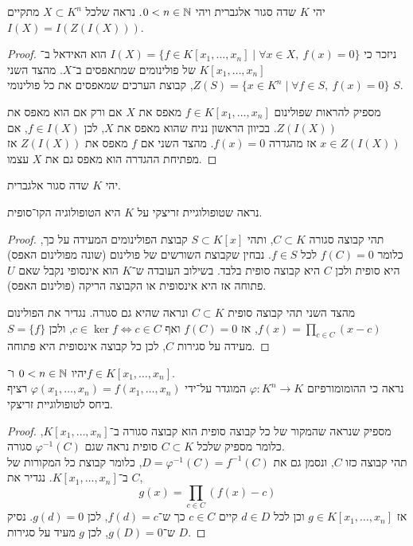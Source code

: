 \question{}
יהי $K$ שדה סגור אלגברית ויהי $0 < n \in \mathbb{N}$.
נראה שלכל $X \subset K^n$ מתקיים $I(X) = I(Z(I(X)))$.
\begin{proof}
	ניזכר כי $I(X) = \{ f \in K[x_1, \ldots, x_n] \mid \forall x \in X,\ f(x) = 0 \}$ הוא האידאל ב־$K[x_1, \ldots, x_n]$ של פולינומים שמתאפסים ב־$X$.
	מהצד השני $Z(S) = \{ x \in K^n \mid \forall f \in S,\ f(x) = 0 \}$, קבוצת הערכים שמאפסים את כל פולינומי $S$.

	מספיק להראות שפולינום $f \in K[x_1, \ldots, x_n]$ מאפס את $X$ אם ורק אם הוא מאפס את $Z(I(X))$.
	בכיוון הראשון נניח שהוא מאפס את $X$, לכן $f \in I(X)$, אם $x \in Z(I(X))$ אז מהגדרה $f(x) = 0$.
	מהצד השני אם $f$ מאפס את $Z(I(X))$ אז מפתיחת ההגדרה הוא מאפס גם את $X$ עצמו.
\end{proof}

\question{}
יהי $K$ שדה סגור אלגברית.

\subquestion{}
נראה שטופולוגיית זריצקי על $K$ היא הטופולוגיה הקו־סופית.
\begin{proof}
	תהי קבוצה סגורה $C \subset K$, ותהי $S \subset K[x]$ קבוצת הפולינומים המעידה על כך, כלומר $f(C) = 0$ לכל $f \in S$.
	נבחין שקבוצת השורשים של פולינום (שונה מפולינום האפס) היא סופית ולכן $C$ היא קבוצה סופית בלבד.
	בשילוב העובדה ש־$K$ הוא אינסופי נקבל שאם $U$ פתוחה אז היא אינסופית או הקבוצה הריקה (פולינום האפס).

	מהצד השני תהי קבוצה סופית $C \subset K$ ונראה שהיא גם סגורה.
	נגדיר את הפולינום $f(x) = \prod_{c \in C} (x - c)$, אז $f(C) = 0$ ואף $c \in \ker f \iff c \in C$, ולכן $S = \{ f \}$ מעידה על סגירות $C$, לכן כל קבוצה אינסופית היא פתוחה.
\end{proof}

\subquestion{}
יהיו $0 < n \in \mathbb{N}$ ו־$f \in K[x_1, \ldots, x_n]$. \\
נראה כי ההומומורפיזם $\varphi : K^n \to K$ המוגדר על־ידי $\varphi(x_1, \ldots, x_n) = f(x_1, \ldots, x_n)$ רציף ביחס לטופולוגיית זריצקי.
\begin{proof}
	מספיק שנראה שהמקור של כל קבוצה סופית הוא קבוצה סגורה ב־$K[x_1, \ldots, x_n]$, כלומר מספיק שלכל $C \subset K$ סופית נראה שגם $\varphi^{-1}(C)$ סגורה. \\
	תהי קבוצה כזו $C$, ונסמן גם את $D = \varphi^{-1}(C) = f^{-1}(C)$, כלומר קבוצת כל המקורות של $C$ ב־$K[x_1, \ldots, x_n]$.
	נגדיר את,
	\[
		g(x)
		= \prod_{c \in C} (f(x) - c)
	\]
	אז $g \in K[x_1, \ldots, x_n]$ וכן לכל $d \in D$ קיים $c \in C$ כך ש־$f(d) = c$, לכן $g(d) = 0$.
	נסיק ש־$g(D) = 0$, לכן $g$ מעיד על סגירות $D$.
\end{proof}

